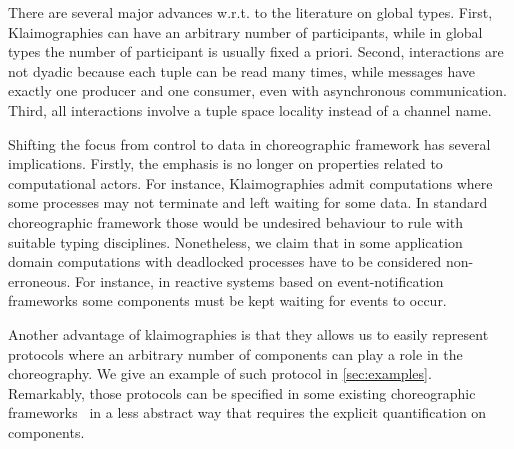 There are several major advances w.r.t. to the literature on global types.
First, Klaimographies can have an arbitrary number of participants, while in global types the number of participant is usually fixed a priori.
Second, interactions are not dyadic because each tuple can be read many times, while messages have exactly one producer and one consumer, even with asynchronous communication.
Third, all interactions involve a tuple space locality instead of a channel name.

%
Shifting the focus from control to data in choreographic framework has
several implications.
%
Firstly, the emphasis is no longer on properties related to
computational actors.
%
For instance, Klaimographies admit computations where some processes
may not terminate and left waiting for some data.
%
In standard choreographic framework those would be undesired behaviour
to rule with suitable typing disciplines.
%
Nonetheless, we claim that in some application domain computations with
deadlocked processes have to be considered non-erroneous.
%
For instance, in reactive systems based on event-notification
frameworks some  components must be kept waiting for
events to occur.
%

Another advantage of klaimographies is that they allows us to easily
represent protocols where an arbitrary number of components can
play a role in the choreography.
%
We give an example of such protocol in \cref{sec:examples}.
%
Remarkably, those protocols can be specified in some existing
choreographic frameworks~\cite{ydbh10,chjny19} in a less abstract way
that requires the explicit quantification on components.




